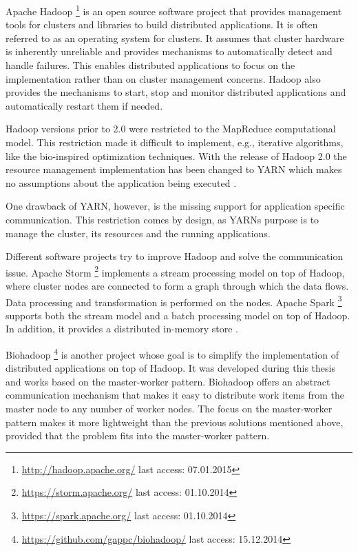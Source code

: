 Apache Hadoop \footnote{\url{http://hadoop.apache.org/} last access: 07.01.2015} is an open source software project that provides management tools for clusters and libraries to build distributed applications. It is often referred to as an operating system for clusters. It assumes that cluster hardware is inherently unreliable and provides mechanisms to automatically detect and handle failures. This enables distributed applications to focus on the implementation rather than on cluster management concerns. Hadoop also provides the mechanisms to start, stop and monitor distributed applications and automatically restart them if needed.

Hadoop versions prior to 2.0 were restricted to the MapReduce \cite{dean2008mapreduce} computational model. This restriction made it difficult to implement, e.g., iterative algorithms, like the bio-inspired optimization techniques. With the release of Hadoop 2.0 the resource management implementation has been changed to YARN \cite{vavilapalli2013apache} which makes no assumptions about the application being executed .

One drawback of YARN, however, is the missing support for application specific communication. This restriction comes by design, as YARNs purpose is to manage the cluster, its resources and the running applications.

Different software projects try to improve Hadoop and solve the communication issue. Apache Storm \footnote{\url{https://storm.apache.org/} last access: 01.10.2014} implements a stream processing model on top of Hadoop, where cluster nodes are connected to form a graph through which the data flows. Data processing and transformation is performed on the nodes. Apache Spark \footnote{\url{https://spark.apache.org/} last access: 01.10.2014} supports both the stream model and a batch processing model on top of Hadoop. In addition, it provides a distributed in-memory store \cite{zaharia2012resilient}.

Biohadoop \footnote{\url{https://github.com/gappc/biohadoop/} last access: 15.12.2014} is another project whose goal is to simplify the implementation of distributed applications on top of Hadoop. It was developed during this thesis and works based on the master-worker pattern. Biohadoop offers an abstract communication mechanism that makes it easy to distribute work items from the master node to any number of worker nodes. The focus on the master-worker pattern makes it more lightweight than the previous solutions mentioned above, provided that the problem fits into the master-worker pattern.

